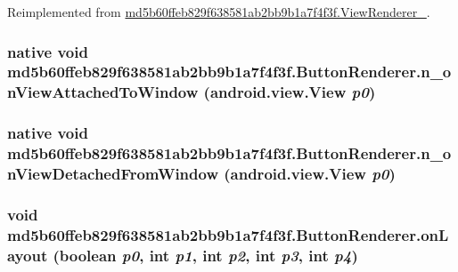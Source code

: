 Reimplemented from \hyperlink{classmd5b60ffeb829f638581ab2bb9b1a7f4f3f_1_1_view_renderer__2_40c528ea52e22dd29fa541de43c0a010}{md5b60ffeb829f638581ab2bb9b1a7f4f3f.ViewRenderer\_}.\hypertarget{classmd5b60ffeb829f638581ab2bb9b1a7f4f3f_1_1_button_renderer_e11be655e3149b651da2d9352cea7df7}{
\subsubsection[{n\_\-onViewAttachedToWindow}]{\setlength{\rightskip}{0pt plus 5cm}native void md5b60ffeb829f638581ab2bb9b1a7f4f3f.ButtonRenderer.n\_\-onViewAttachedToWindow (android.view.View {\em p0})}}
\label{classmd5b60ffeb829f638581ab2bb9b1a7f4f3f_1_1_button_renderer_e11be655e3149b651da2d9352cea7df7}


\hypertarget{classmd5b60ffeb829f638581ab2bb9b1a7f4f3f_1_1_button_renderer_702a0699c60f3404a3f34f8917d769a1}{
\subsubsection[{n\_\-onViewDetachedFromWindow}]{\setlength{\rightskip}{0pt plus 5cm}native void md5b60ffeb829f638581ab2bb9b1a7f4f3f.ButtonRenderer.n\_\-onViewDetachedFromWindow (android.view.View {\em p0})}}
\label{classmd5b60ffeb829f638581ab2bb9b1a7f4f3f_1_1_button_renderer_702a0699c60f3404a3f34f8917d769a1}


\hypertarget{classmd5b60ffeb829f638581ab2bb9b1a7f4f3f_1_1_button_renderer_32dc12b457387df026545663655ce4b2}{
\subsubsection[{onLayout}]{\setlength{\rightskip}{0pt plus 5cm}void md5b60ffeb829f638581ab2bb9b1a7f4f3f.ButtonRenderer.onLayout (boolean {\em p0}, \/  int {\em p1}, \/  int {\em p2}, \/  int {\em p3}, \/  int {\em p4})}}
\label{classmd5b60ffeb829f638581ab2bb9b1a7f4f3f_1_1_button_renderer_32dc12b457387df026545663655ce4b2}




